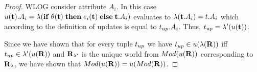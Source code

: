 {\begin{proof}
WLOG consider attribute $A_i$. In this case $u(\mathbf{t}).A_i = \lambda(\mathbf{if}\thickspace \theta(\mathbf{t}) \thickspace \mathbf{then} \thickspace e_i(\mathbf{t}) \thickspace \mathbf{else} \thickspace \mathbf{t}.A_i)$ evaluates to $\lambda(\mathbf{t}.A_i) = t.A_i$ which according to the definition of updates is equal to $t_{up}.A_i$. Thus, $t_{up} = \lambda'(u(\mathbf{t}))$.

Since we have shown that for every tuple $t_{up}$ we have $t_{up} \in u(\lambda(\mathbf{R}))$ iff $t_{up} \in \lambda'(u(\mathbf{R}))$ and $\mathbf{R}_{\lambda'}$ is the unique world from $Mod({u(\mathbf{R})})$ corresponding to $\mathbf{R}_{\lambda}$, we have shown that $Mod({u(\mathbf{R})}) = u(Mod({\mathbf{R}}))$.















\end{proof}}
